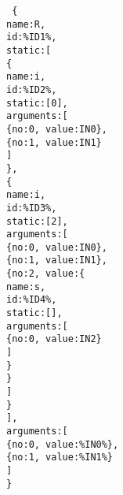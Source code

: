\texttt{
\{\\
\indent name:R,\\
\indent id:\%ID1\%,\\
\indent static:[\\
\indent \{\\
\indent \indent name:i,\\
\indent \indent id:\%ID2\%,\\
\indent \indent static:[0],\\
\indent \indent arguments:[\\
\indent \indent \indent \{no:0, value:IN0\},\\
\indent \indent \indent \{no:1, value:IN1\}\\
\indent \indent ]\\
\indent \},\\
\indent \{\\
\indent \indent name:i,\\
\indent \indent id:\%ID3\%,\\
\indent \indent static:[2],\\
\indent \indent arguments:[\\
\indent \indent \indent \{no:0, value:IN0\},\\
\indent \indent \indent \{no:1, value:IN1\},\\
\indent \indent \indent \{no:2, value:\{\\
\indent \indent \indent \indent name:s,\\
\indent \indent \indent \indent id:\%ID4\%,\\
\indent \indent \indent \indent static:[],\\
\indent \indent \indent \indent arguments:[\\
\indent \indent \indent \indent \indent \{no:0, value:IN2\}\\
\indent \indent \indent \indent ]\\
\indent \indent \indent \indent \}\\
\indent \indent \indent \}\\
\indent \indent ]\\
\indent \}\\
\indent ],\\
\indent arguments:[\\
\indent \indent \{no:0, value:\%IN0\%\},\\
\indent \indent \{no:1, value:\%IN1\%\}\\
\indent ] \\
\}\\
}

